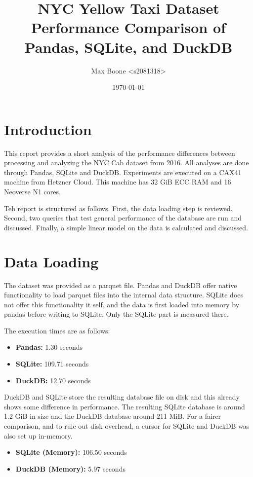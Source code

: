 \documentclass[a4paper,10pt]{article}
\title{
  NYC Yellow Taxi Dataset
\small Performance Comparison of Pandas, SQLite, and DuckDB}
\author{Max Boone <s2081318>}
\date{\today}
\begin{document}
\maketitle

\section{Introduction}

This report provides a short analysis of the performance differences
between processing and analyzing the NYC Cab dataset from 2016. All
analyses are done through Pandas, SQLite and DuckDB. Experiments are 
executed on a CAX41 machine from Hetzner Cloud. This
machine has 32 GiB ECC RAM and 16 Neoverse N1 cores.

Teh report is structured as follows. First, the data
loading step is reviewed. Second, two queries that test general
performance of the database are run and discussed. Finally, a simple
linear model on the data is calculated and discussed.

\section{Data Loading}

The dataset was provided as a parquet file. Pandas and DuckDB offer
native functionality to load parquet files into the internal data
structure. SQLite does not offer this functionality it self, and
the data is first loaded into memory by pandas before writing to
SQLite. Only the SQLite part is measured there. 

The execution times are as follows:

\begin{itemize}
  \item \textbf{Pandas:} 1.30 seconds
  \item \textbf{SQLite:} 109.71 seconds
  \item \textbf{DuckDB:} 12.70 seconds
\end{itemize}

DuckDB and SQLite store the resulting database file on disk and this
already shows some difference in performance. The resulting SQLite database
is around 1.2 GiB in size and the DuckDB database around 211 MiB. For a fairer
comparison, and to rule out disk overhead, a cursor for SQLite and DuckDB was
also set up in-memory.

\begin{itemize}
  \item \textbf{SQLite (Memory):} 106.50 seconds
  \item \textbf{DuckDB (Memory):} 5.97 seconds
\end{itemize}
\end{document}
